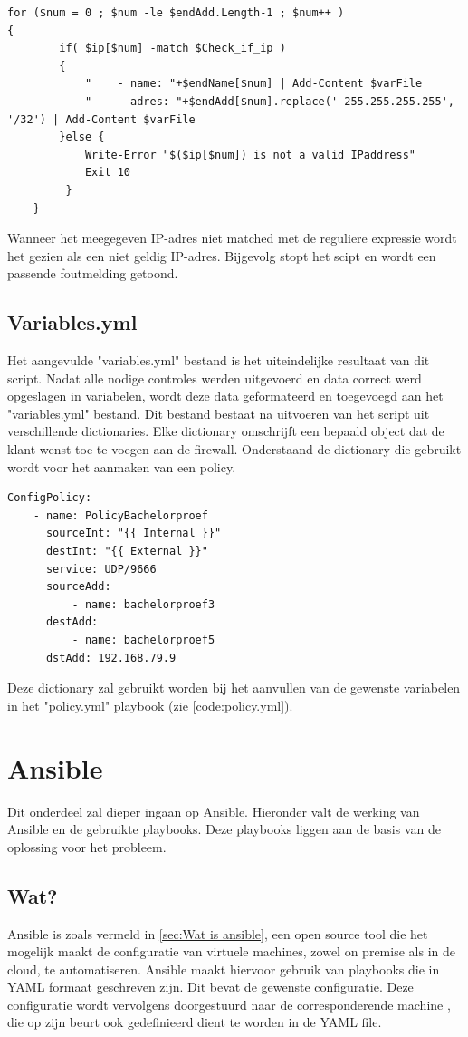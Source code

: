 \begin{lstlisting}[caption={main.ps1, controle ip}]
for ($num = 0 ; $num -le $endAdd.Length-1 ; $num++ )
{
        if( $ip[$num] -match $Check_if_ip ) 
        {
            "    - name: "+$endName[$num] | Add-Content $varFile
            "      adres: "+$endAdd[$num].replace(' 255.255.255.255', '/32') | Add-Content $varFile 
        }else {
            Write-Error "$($ip[$num]) is not a valid IPaddress"
            Exit 10
         }
    }
\end{lstlisting}
Wanneer het meegegeven IP-adres niet matched met de reguliere expressie wordt het gezien als een niet geldig IP-adres. Bijgevolg stopt het scipt en wordt een passende foutmelding getoond. 

\subsection{Variables.yml}
Het aangevulde "variables.yml" bestand is het uiteindelijke resultaat van dit script. Nadat alle nodige controles werden uitgevoerd en data correct werd opgeslagen in variabelen, wordt deze data geformateerd en toegevoegd aan het "variables.yml" bestand. Dit bestand bestaat na uitvoeren van het script uit verschillende dictionaries. Elke dictionary omschrijft een bepaald object dat de klant wenst toe te voegen aan de firewall. Onderstaand de dictionary die gebruikt wordt voor het aanmaken van een policy. 

\begin{lstlisting}[caption={Voorbeeld variables.yml voor policy}]
    ConfigPolicy: 
    - name: PolicyBachelorproef
      sourceInt: "{{ Internal }}"
      destInt: "{{ External }}"
      service: UDP/9666
      sourceAdd: 
          - name: bachelorproef3
      destAdd: 
          - name: bachelorproef5
      dstAdd: 192.168.79.9
\end{lstlisting}
Deze dictionary zal gebruikt worden bij het aanvullen van de gewenste variabelen in het "policy.yml" playbook (zie \ref{code:policy.yml}).
\section{Ansible}
\label{sec:Ansible}
Dit onderdeel zal dieper ingaan op Ansible. Hieronder valt de werking van Ansible en de gebruikte playbooks. Deze playbooks liggen aan de basis van de oplossing voor het probleem. 

\subsection{Wat?}
Ansible is zoals vermeld in \ref{sec:Wat is ansible}, een open source tool die het mogelijk maakt de configuratie van virtuele machines, zowel on premise als in de cloud, te automatiseren. Ansible maakt hiervoor gebruik van playbooks die in YAML formaat geschreven zijn. Dit bevat de gewenste configuratie. Deze configuratie wordt vervolgens doorgestuurd naar de corresponderende machine , die op zijn beurt ook gedefinieerd dient te worden in de YAML file.

